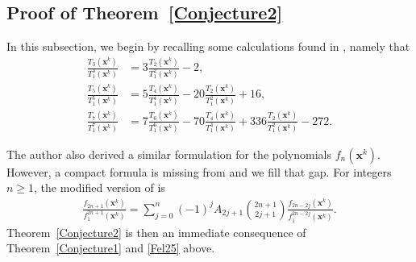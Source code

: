 \documentclass[11pt]{amsart}
\theoremstyle{definition}
\theoremstyle{remark}
\numberwithin{equation}{section}
\begin{document}
\subsection{Proof of Theorem~\ref{Conjecture2}}
In this subsection, we begin by recalling some calculations found in \cite[p. 59, (13)]{Fel}, namely that
\begin{align*}
\frac{T_3(\pmb{x}^k)}{T_1^3(\pmb{x}^k)} & = 3 \frac{T_2(\pmb{x}^k)}{T_1^2(\pmb{x}^k)}  -2 , \\
\frac{T_5(\pmb{x}^k)}{T_1^5(\pmb{x}^k)} & = 5 \frac{T_4(\pmb{x}^k)}{T_1^4(\pmb{x}^k)}  -20 \frac{T_2(\pmb{x}^k)}{T_1^2(\pmb{x}^k)}  +16, \\
\frac{T_7(\pmb{x}^k)}{T_1^7(\pmb{x}^k)} & = 7 \frac{T_6(\pmb{x}^k)}{T_1^6(\pmb{x}^k)} - 70 \frac{T_4(\pmb{x}^k)}{T_1^4(\pmb{x}^k)} 
+336 \frac{T_2(\pmb{x}^k)}{T_1^2(\pmb{x}^k)}  -272.
\end{align*}


The author \cite{Fel} also derived a similar formulation for the polynomials 
$f_n(\pmb{x}^k)$. However, a compact formula is missing from \cite[(25)-(26)]{Fel} and we fill that gap. 
For integers $n\geq1$, the modified version of \cite[page 61,  (25)]{Fel} is
\begin{align}  \label{Fel25}
\frac{f_{2n+1}(\pmb{x}^k)}{f_1^{2n+1}(\pmb{x}^k)}
= \sum_{j=0}^n (-1)^j A_{2j+1}\binom{2n+1}{2j+1} \frac{f_{2n-2j}(\pmb{x}^k)}{f_1^{2n-2j}(\pmb{x}^k)}.
\end{align}
Theorem~\ref{Conjecture2} is then an immediate consequence of Theorem~\ref{Conjecture1} and \eqref{Fel25} above.
\end{document}
